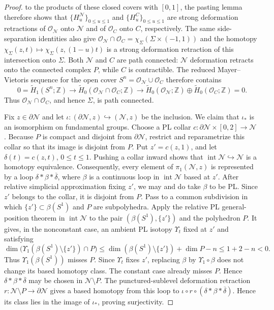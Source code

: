 \documentclass[12pt,oneside,a4paper]{article}
\theoremstyle{mytheorem}
\theoremstyle{remark}
\theoremstyle{definition}
\begin{document}
\begin{proof}
to the products of these closed covers with $[0,1]$, the pasting lemma
therefore shows that
$\{H^{\mathcal{N}}_u\}_{0\leq u\leq1}$ and
$\{H^C_u\}_{0\leq u\leq1}$ are strong deformation retractions of
$\mathcal{O}_{\mathcal{N}}$ onto $\mathcal{N}$ and of
$\mathcal{O}_C$ onto $C$, respectively.  The same side-separation
identities also give
$\mathcal{O}_{\mathcal{N}}\cap\mathcal{O}_C
=\chi_\Sigma(\Sigma\times(-1,1))$
and the homotopy
$\chi_\Sigma(z,t)\mapsto\chi_\Sigma(z,(1-u)t)$ is a strong deformation
retraction of this intersection onto $\Sigma$.  Both $\mathcal{N}$ and
$C$ are path
connected: $\mathcal{N}$ deformation retracts onto the connected complex
$P$, while $C$ is contractible.  The reduced Mayer--Vietoris sequence
for the open cover $S^n=\mathcal{O}_{\mathcal{N}}\cup\mathcal{O}_C$
therefore contains
\[
 0=\widetilde H_1(S^n;\mathbb Z)
 \longrightarrow
 \widetilde H_0(\mathcal{O}_{\mathcal{N}}\cap\mathcal{O}_C;\mathbb Z)
 \longrightarrow
 \widetilde H_0(\mathcal{O}_{\mathcal{N}};\mathbb Z)
 \oplus\widetilde H_0(\mathcal{O}_C;\mathbb Z)=0.
\]
Thus $\mathcal{O}_{\mathcal{N}}\cap\mathcal{O}_C$, and hence $\Sigma$, is
path connected.

Fix $z\in\partial\mathcal{N}$ and let
$\iota:(\partial\mathcal{N},z)\hookrightarrow(\mathcal{N},z)$ be the
inclusion.  We claim that $\iota_*$ is an isomorphism on fundamental
groups.  Choose a PL collar
$c:\partial\mathcal{N}\times[0,2]\to\mathcal{N}$
\cite[Corollary~2.5]{zbMATH01714503}.  Because $P$ is compact and
disjoint from $\partial\mathcal{N}$, restrict and reparametrize this
collar so that its image is disjoint from $P$.  Put
$z'=c(z,1)$, and let $\delta(t)=c(z,t)$, $0\leq t\leq1$.  Pushing a
collar inward shows that
$\operatorname{int}\mathcal{N}\hookrightarrow\mathcal{N}$ is a homotopy equivalence.
Consequently, every element of $\pi_1(\mathcal{N},z)$ is represented by a
loop $\delta*\beta*\overline\delta$, where $\beta$ is a continuous loop
in $\operatorname{int}\mathcal{N}$ based at $z'$.  After relative
simplicial approximation fixing $z'$, we may and do take $\beta$ to be
PL.  Since $z'$ belongs to the
collar, it is disjoint from $P$.  Pass to a common subdivision in which
$\{z'\}\subset\beta(S^1)$ and $P$ are subpolyhedra.  Apply the relative PL
general-position theorem \cite[Theorem~4.2]{zbMATH01714503} in
$\operatorname{int}\mathcal{N}$ to the pair
$(\beta(S^1),\{z'\})$ and the polyhedron $P$.  It gives, in the
nonconstant case, an ambient PL isotopy $\Upsilon_t$ fixed at $z'$ and
satisfying
\[
 \dim\bigl(\Upsilon_1(\beta(S^1)\setminus\{z'\})\cap P\bigr)
 \leq \dim(\beta(S^1)\setminus\{z'\})+\dim P-n
 \leq1+2-n<0.
\]
Thus $\Upsilon_1(\beta(S^1))$ misses $P$.  Since $\Upsilon_t$ fixes
$z'$, replacing $\beta$ by $\Upsilon_1\circ\beta$ does not change its
based homotopy class.  The constant case already misses $P$.  Hence
$\delta*\beta*\overline\delta$ may be chosen in $\mathcal{N}\setminus P$.
The punctured-sublevel deformation retraction
$r:\mathcal{N}\setminus P\to\partial\mathcal{N}$ gives a based homotopy from this loop to
$\iota\circ r\circ(\delta*\beta*\overline\delta)$.  Hence its class lies
in the image of $\iota_*$, proving surjectivity.


\end{proof}
\end{document}

